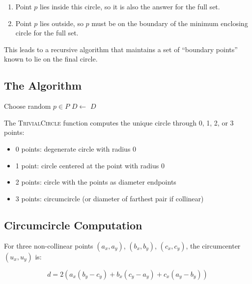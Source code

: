 \documentclass[11pt,a4paper]{article}
\begin{document}
\begin{enumerate}
    \item Point $p$ lies inside this circle, so it is also the answer for the full set.
    \item Point $p$ lies outside, so $p$ must be on the boundary of the minimum enclosing circle for the full set.
\end{enumerate}

This leads to a recursive algorithm that maintains a set of ``boundary points'' known to lie on the final circle.

\subsection{The Algorithm}

\begin{algorithm}
\caption{Welzl's Algorithm}
\begin{algorithmic}[1]
        \State \Return {}
    \EndIf
    \State Choose random $p \in P$
    \State $D \gets$ 
        \State \Return $D$
    \EndIf
    \State \Return {}
\EndFunction
\end{algorithmic}
\end{algorithm}

The \textsc{TrivialCircle} function computes the unique circle through 0, 1, 2, or 3 points:
\begin{itemize}
    \item 0 points: degenerate circle with radius 0
    \item 1 point: circle centered at the point with radius 0
    \item 2 points: circle with the points as diameter endpoints
    \item 3 points: circumcircle (or diameter of farthest pair if collinear)
\end{itemize}

\subsection{Circumcircle Computation}

For three non-collinear points $(a_x, a_y)$, $(b_x, b_y)$, $(c_x, c_y)$, the circumcenter $(u_x, u_y)$ is:

\begin{equation}
    d = 2(a_x(b_y - c_y) + b_x(c_y - a_y) + c_x(a_y - b_y))
\end{equation}
\end{document}
